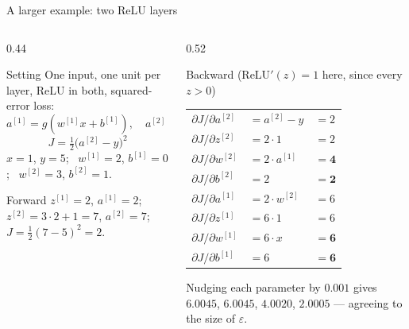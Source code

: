 \documentclass[aspectratio=169,10pt]{beamer}
\begin{document}
\begin{frame}{A larger example: two ReLU layers}
  \footnotesize
  \begin{columns}[T,onlytextwidth]
    \begin{column}{0.44\textwidth}
      \begin{block}{Setting}
        One input, one unit per layer, ReLU in both, squared-error loss:
        \[ a^{[1]}=g(w^{[1]}x+b^{[1]}),\quad a^{[2]}=g(w^{[2]}a^{[1]}+b^{[2]}) \]
        \[ J=\tfrac12\bigl(a^{[2]}-y\bigr)^2 \]
        $x=1$, $y=5$; \ $w^{[1]}=2$, $b^{[1]}=0$; \ $w^{[2]}=3$, $b^{[2]}=1$.
      \end{block}
      \begin{block}{Forward}
        $z^{[1]}=2$, $a^{[1]}=2$; \ $z^{[2]}=3\cdot2+1=7$, $a^{[2]}=7$;\\
        $J=\tfrac12(7-5)^2=2$.
      \end{block}
    \end{column}
    \begin{column}{0.52\textwidth}
      \begin{block}{Backward (ReLU$'(z)=1$ here, since every $z>0$)}
        \renewcommand{\arraystretch}{1.25}
        \begin{tabular}{@{}lll@{}}
          $\partial J/\partial a^{[2]}$ & $=a^{[2]}-y$ & $=2$\\
          $\partial J/\partial z^{[2]}$ & $=2\cdot1$ & $=2$\\
          $\partial J/\partial w^{[2]}$ & $=2\cdot a^{[1]}$ & $=\mathbf{4}$\\
          $\partial J/\partial b^{[2]}$ & $=2$ & $=\mathbf{2}$\\
          $\partial J/\partial a^{[1]}$ & $=2\cdot w^{[2]}$ & $=6$\\
          $\partial J/\partial z^{[1]}$ & $=6\cdot1$ & $=6$\\
          $\partial J/\partial w^{[1]}$ & $=6\cdot x$ & $=\mathbf{6}$\\
          $\partial J/\partial b^{[1]}$ & $=6$ & $=\mathbf{6}$\\
        \end{tabular}
      \end{block}
      \begin{pitfall}
        \footnotesize Nudging each parameter by $0.001$ gives $6.0045$, $6.0045$,
        $4.0020$, $2.0005$ --- agreeing to the size of $\varepsilon$.
      \end{pitfall}
    \end{column}
  \end{columns}
\end{frame}
\end{document}
